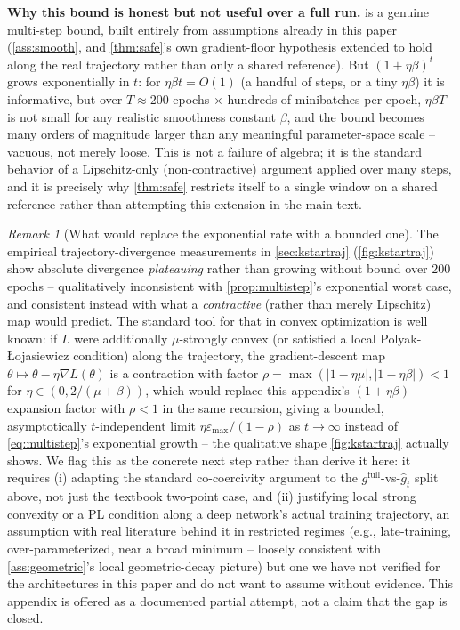 \documentclass{article}
\theoremstyle{plain}
\theoremstyle{definition}
\theoremstyle{remark}
\newtheorem{remark}[theorem]{Remark}
\begin{document}
\textbf{Why this bound is honest but not useful over a full run.}  is a genuine multi-step bound, built entirely from assumptions already in this paper (\cref{ass:smooth}, and \cref{thm:safe}'s own gradient-floor hypothesis extended to hold along the real trajectory rather than only a shared reference). But $(1+\eta\beta)^t$ grows exponentially in $t$: for $\eta\beta t = O(1)$ (a handful of steps, or a tiny $\eta\beta$) it is informative, but over $T\approx 200$ epochs $\times$ hundreds of minibatches per epoch, $\eta\beta T$ is not small for any realistic smoothness constant $\beta$, and the bound becomes many orders of magnitude larger than any meaningful parameter-space scale -- vacuous, not merely loose. This is not a failure of algebra; it is the standard behavior of a Lipschitz-only (non-contractive) argument applied over many steps, and it is precisely why \cref{thm:safe} restricts itself to a single window on a shared reference rather than attempting this extension in the main text.

\begin{remark}[What would replace the exponential rate with a bounded one]
\label{rem:contraction-direction}
The empirical trajectory-divergence measurements in \cref{sec:kstartraj} (\cref{fig:kstartraj}) show absolute divergence \emph{plateauing} rather than growing without bound over $200$ epochs -- qualitatively inconsistent with \cref{prop:multistep}'s exponential worst case, and consistent instead with what a \emph{contractive} (rather than merely Lipschitz) map would predict. The standard tool for that in convex optimization is well known: if $L$ were additionally $\mu$-strongly convex (or satisfied a local Polyak-\L{}ojasiewicz condition) along the trajectory, the gradient-descent map $\theta\mapsto\theta-\eta\nabla L(\theta)$ is a contraction with factor $\rho=\max(|1-\eta\mu|,|1-\eta\beta|)<1$ for $\eta\in(0,2/(\mu+\beta))$, which would replace this appendix's $(1+\eta\beta)$ expansion factor with $\rho<1$ in the same recursion, giving a bounded, asymptotically $t$-independent limit $\eta\varepsilon_{\max}/(1-\rho)$ as $t\to\infty$ instead of \cref{eq:multistep}'s exponential growth -- the qualitative shape \cref{fig:kstartraj} actually shows. We flag this as the concrete next step rather than derive it here: it requires (i) adapting the standard co-coercivity argument to the $g^{\mathrm{full}}$-vs-$\hat g_t$ split above, not just the textbook two-point case, and (ii) justifying local strong convexity or a PL condition along a deep network's actual training trajectory, an assumption with real literature behind it in restricted regimes (e.g., late-training, over-parameterized, near a broad minimum -- loosely consistent with \cref{ass:geometric}'s local geometric-decay picture) but one we have not verified for the architectures in this paper and do not want to assume without evidence. This appendix is offered as a documented partial attempt, not a claim that the gap is closed.
\end{remark}
\end{document}
